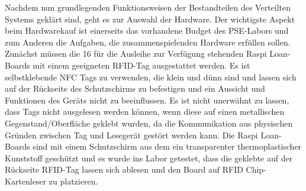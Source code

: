 Nachdem nun grundlegenden Funktionsweisen der Bestandteilen des Verteilten Systems geklärt sind, geht es zur Auswahl der Hardware. Der wichtigste Aspekt beim Hardwarekauf ist einerseits das vorhandene Budget des PSE-Labors und zum Anderen die Aufgaben, die zusammenspielenden Hardware erfüllen sollen. Zunächst müssen die 16 für die Ausleihe zur Verfügung stehenden Raspi Loan-Boards mit einem geeigneten RFID-Tag ausgestattet werden. Es ist selbstklebende NFC Tags zu verwenden, die klein und dünn sind und lassen sich auf der Rückseite des Schutzschirms zu befestigen und ein Aussicht und Funktionen des Geräts nicht zu beeinflussen. Es ist nicht unerwähnt zu lassen, dass Tags nicht ausgelesen werden können, wenn diese auf einen metallischen Gegenstand/Oberfläche geklebt wurden, da die Kommunikation aus physischen Gründen zwischen Tag und Lesegerät gestört werden kann. Die Raspi Loan-Boards sind mit einem Schutzschirm aus dem ein transparenter thermoplastischer Kunststoff geschützt und es wurde ins Labor getestet, dass die geklebte auf der Rückseite RFID-Tag lassen sich ablesen und den Board auf RFID Chip-Kartenleser zu platzieren. 